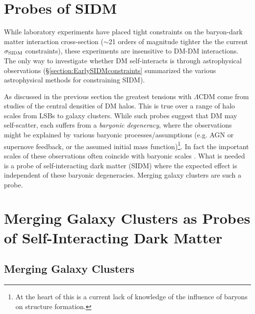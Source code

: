 \section{Probes of SIDM}\label{section:SIDMprobes}

While laboratory experiments have placed tight constraints on the baryon-dark matter interaction cross-section ($\sim$21 orders of magnitude tighter the the current $\sigma_{\rm SIDM}$ constraints), these experiments are insensitive to DM-DM interactions.
The only way to investigate whether DM self-interacts is through astrophysical observations (\S\ref{section:EarlySIDMconstraints} summarized the various astrophysical methods for constraining SIDM). 

As discussed in the previous section the greatest tensions with $\Lambda$CDM come from studies of the central densities of DM halos.
This is true over a range of halo scales from LSBs to galaxy clusters.
While such probes suggest that DM may self-scatter, each suffers from a \emph{baryonic degeneracy}, where the observations might be explained by various baryonic processes/assumptions (e.g. AGN or supernove feedback, or the assumed initial mass function)\footnote{At the heart of this is a current lack of knowledge of the influence of baryons on structure formation.}.
In fact the important scales of these observations often coincide with baryonic scales \citep[e.g. the core size in clusters is few factors smaller than the effective radius of the brightest cluster galaxy;][]{Newman:2012wt, Newman:2012tk}.
What is needed is a probe of self-interacting dark matter (SIDM) where the expected effect is independent of these baryonic degeneracies.
Merging galaxy clusters are such a probe. 

\section{Merging Galaxy Clusters as Probes of Self-Interacting Dark Matter}\label{section:MergingClustersSIDMprobe}

\subsection{Merging Galaxy Clusters}\label{Section:MergingClusters}

